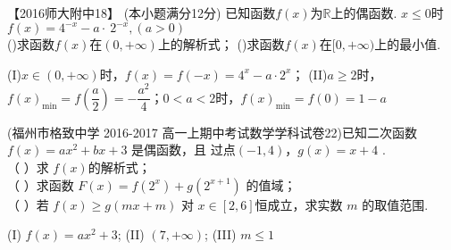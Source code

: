 \begin{exercise}
      【2016师大附中18】 (本小题满分12分)
      已知函数$f(x)$为$\mathbb{R}$上的偶函数. $x\leq0$时$f(x)=4^{-x}-a\cdot~2^{-x},(a>0)$\\
      ()求函数$f(x)$在$(0,+\infty)$上的解析式；
      ()求函数$f(x)$在$[0,+\infty)$上的最小值.
      \begin{answer}
        (I)$x\in(0,+\infty)$时，$f(x)=f(-x)=4^x-a\cdot 2^x$；\hspace{2em}
        (II)$a\geq2$时，$f(x)_{\min}=f(\dfrac{a}2)=-\dfrac{a^2}4$；$0<a<2$时，$f(x)_{\min}=f(0)=1-a$
      \end{answer}
    \vspace{12em}
    \item
      (福州市格致中学 2016-2017 高一上期中考试数学学科试卷22)已知二次函数 $f ( x )= ax^2+ bx+3$ 是偶函数，且 过点$(-1,4)$，$ g ( x )= x + 4$ .\\
      （ ）求 $f (x) $的解析式；\\
      （ ）求函数 $F ( x )= f (2^x )+ g (2^{x+1} )$ 的值域； \\
      （ ）若 $f ( x ) \geq g ( mx +m )$ 对 $x\in [2, 6] $恒成立，求实数 $m$ 的取值范围.\\
      \begin{answer}
      (I) $f(x)=ax^2+3$; (II) $(7,+\infty)$; (III) $m\leq1$
      \end{answer}
      \vspace{13em}
    \vspace{12em}
  \end{exercise}

\newpage
